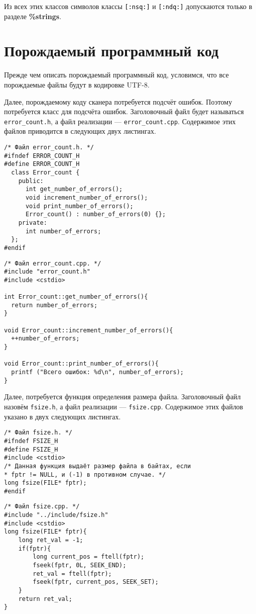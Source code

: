 \documentclass[10pt]{report}
\newcounter{rem}[section]
\newcounter{defin}[section]
\begin{document}
Из всех этих классов символов классы \texttt{\textcolor{Black}{[:nsq:]}} и \texttt{\textcolor{Black}{[:ndq:]}} допускаются только в разделе \textbf{\%strings}.

    \section{Порождаемый программный код}
Прежде чем описать порождаемый программный код, условимся, что все порождаемые файлы будут в кодировке UTF-8.

Далее, порождаемому коду сканера потребуется подсчёт ошибок. Поэтому потребуется класс для подсчёта ошибок. Заголовочный файл будет называться \texttt{error_count.h}, а 
файл реализации --- \texttt{error_count.cpp}. Содержимое этих файлов приводится в следующих двух листингах.

\begin{verbatim}
/* Файл error_count.h. */
#ifndef ERROR_COUNT_H
#define ERROR_COUNT_H
  class Error_count {
    public:
      int get_number_of_errors();
      void increment_number_of_errors();
      void print_number_of_errors();
      Error_count() : number_of_errors(0) {};
    private:
      int number_of_errors;
  };
#endif
\end{verbatim}
\begin{verbatim}
/* Файл error_count.cpp. */
#include "error_count.h"
#include <cstdio>

int Error_count::get_number_of_errors(){
  return number_of_errors;
}

void Error_count::increment_number_of_errors(){
  ++number_of_errors;
}

void Error_count::print_number_of_errors(){
  printf ("Всего ошибок: %d\n", number_of_errors); 
}
\end{verbatim}

Далее, потребуется функция определения размера файла. Заголовочный файл назовём \texttt{fsize.h}, а файл реализации --- \texttt{fsize.cpp}. Содержимое этих файлов указано в двух следующих листингах.
\begin{verbatim}
/* Файл fsize.h. */
#ifndef FSIZE_H
#define FSIZE_H
#include <cstdio>
/* Данная функция выдаёт размер файла в байтах, если
* fptr != NULL, и (-1) в противном случае. */
long fsize(FILE* fptr);
#endif
\end{verbatim}

\begin{verbatim}
/* Файл fsize.cpp. */
#include "../include/fsize.h"
#include <cstdio>
long fsize(FILE* fptr){
    long ret_val = -1;
    if(fptr){
        long current_pos = ftell(fptr);
        fseek(fptr, 0L, SEEK_END);
        ret_val = ftell(fptr);
        fseek(fptr, current_pos, SEEK_SET);
    }
    return ret_val;
}
\end{verbatim}
\end{document}
